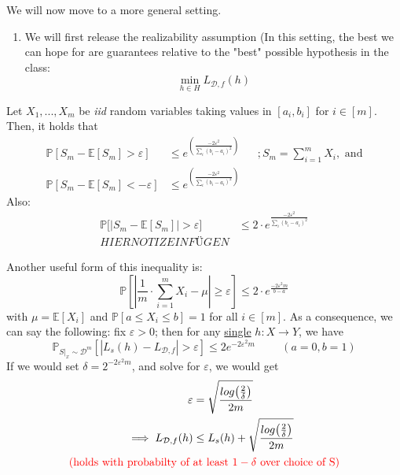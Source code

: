 \documentclass[10pt,a4paper]{article}
\theoremstyle{definition}
\theoremstyle{plain}
\begin{document}
We will now move to a more general setting.
\begin{enumerate}[label*=\protect\fbox{\arabic{enumi}}]
	\item We will first release the realizability assumption (In this setting, the best we can hope for are guarantees relative to the "best" possible hypothesis in the class: $$\min_{h \in H}{L_{\mathcal{D}, f}(h)}$$
\end{enumerate}
	\begin{boxeddef}
	Let $X_1, ..., X_m$ be \textit{iid} random variables taking values in $[a_i, b_i]$ for $i \in [m]$. Then, it holds that
	 \begin{align*}
	 	\mathbb{P}\left[S_m - \mathbb{E}[S_m] > \varepsilon\right] &\leq e^{\left(\frac{-2 \varepsilon^2}{\sum_{i} (b_i - a_i)^2}\right)} && ; S_m = \sum_{i = 1}^{m} X_i, \text{ and}\\
	 	\mathbb{P}\left[S_m - \mathbb{E}[S_m] < -\varepsilon\right] &\leq e^{\left(\frac{-2 \varepsilon^2}{\sum_{i} (b_i - a_i)^2}\right)} 
	\end{align*}
	Also:
	\begin{align*}
	 	\mathbb{P}\bigg[\big|S_m - \mathbb{E}[S_m]\big| > \varepsilon\bigg] &\leq 2 \cdot e^{\frac{-2 \varepsilon^2}{\sum_{i} (b_i - a_i)^2}}\\
	 	HIER NOTIZ EINFÜGEN
	 \end{align*}

\end{boxeddef}
Another useful form of this inequality is:
$$ \mathbb{P} \left[\left| \frac{1}{m} \cdot \sum_{i = 1}^{m} X_i - \mu \right| \geq \varepsilon\right] \leq 2 \cdot e^{\frac{-2 \varepsilon^2 m}{b-a}} $$
with $\mu = \mathbb{E}[X_i]$ and $\mathbb{P}[a \leq X_i \leq b] = 1$ for all $i \in [m]$. As a consequence, we can say the following: fix $\varepsilon>0$; then for any \colorbox{Apricot}{\underline{single} $h: X \to Y$}, we have 
$$ \mathbb{P}_{S|_x \sim \mathcal{D}^m}\left[\left|L_{s}(h) - L_{\mathcal{D}, f}\right| > \varepsilon\right] \leq 2 e^{-2\varepsilon^2 m} \hspace{1cm} (a = 0, b = 1)$$
If we would set $\delta = 2^{-2 \varepsilon^2 m}$, and solve for $\varepsilon$, we would get
\begin{align*}
\varepsilon &= \sqrt{\frac{log\big(\frac{2}{\delta}\big)}{2m}}\\
\implies L_{\mathcal{D},f}(h) &\leq L_{s}(h) + \sqrt{\frac{log\big(\frac{2}{\delta}\big)}{2m}}\\
\text{\textcolor{red}{(holds with probabilty of }} & \text{\textcolor{red}{at least $1-\delta$ over choice of S)}}
\end{align*}
\end{document}
